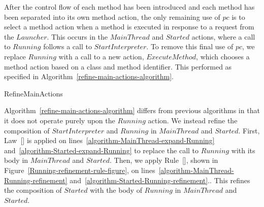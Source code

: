 After the control flow of each method has been introduced and each
method has been separated into its own method action, the only
remaining use of $pc$ is to select a method action when a method is
executed in response to a request from the $Launcher$.
This occurs in the $MainThread$ and $Started$ actions, where a call to
$Running$ follows a call to $StartInterpreter$.
To remove this final use of $pc$, we replace $Running$ with a call to
a new action, $ExecuteMethod$, which chooses a method action based on
a class and method identifier.
This performed as specified in
Algorithm~\ref{refine-main-actions-algorithm}.

\begin{algorithm}
  \begin{algorithmic}[1]
    \State {}
    \label{algorithm-MainThread-expand-Running}
    \State {}
    \label{algorithm-Started-expand-Running}
    \State {}
    \label{algorithm-MainThread-Running-refinement}
    \State {}
    \label{algorithm-Started-Running-refinement}
    \State {}
    \label{algorithm-ExecuteMethod-introduction}
    \State {}
    \label{algorithm-MainThread-copy-ExecuteMethod}
    \State {}
    \label{algorithm-Started-copy-ExecuteMethod}
  \end{algorithmic}
  \caption{RefineMainActions}
  \label{refine-main-actions-algorithm}
\end{algorithm}

Algorithm~\ref{refine-main-actions-algorithm} differs from previous
algorithms in that it does not operate purely upon the $Running$
action.
We instead refine the composition of $StartInterpreter$ and $Running$
in $MainThread$ and $Started$.
First, Law~[] is applied on
lines~\ref{algorithm-MainThread-expand-Running}
and~\ref{algorithm-Started-expand-Running} to replace the call to
$Running$ with its body in $MainThread$ and $Started$.
Then, we apply Rule~[], shown in
Figure~\ref{Running-refinement-rule-figure}, on
lines~\ref{algorithm-MainThread-Running-refinement}
and~\ref{algorithm-Started-Running-refinement}..
This refines the composition of $Started$ with the body of $Running$
in $MainThread$ and $Started$.

